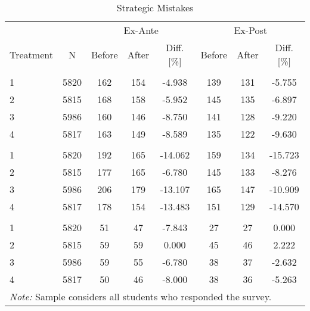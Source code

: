 \begin{table}[!htp]

\caption{Strategic Mistakes \label{tab: summary strategic mistakes}}
\centering
\begin{tabular}[t]{lccccccc}
\toprule
\multicolumn{2}{c}{ } & \multicolumn{3}{c}{Ex-Ante} & \multicolumn{3}{c}{Ex-Post} \\
\cmidrule(l{3pt}r{3pt}){3-5} \cmidrule(l{3pt}r{3pt}){6-8}
Treatment & N & Before & After & Diff. [\%] & Before & After & Diff. [\%]\\
\midrule
\addlinespace[0.3em]
\multicolumn{8}{l}{\textbf{Underconfidence}}\\
\hspace{1em}1 & 5820 & 162 & 154 & -4.938 & 139 & 131 & -5.755\\
\hspace{1em}2 & 5815 & 168 & 158 & -5.952 & 145 & 135 & -6.897\\
\hspace{1em}3 & 5986 & 160 & 146 & -8.750 & 141 & 128 & -9.220\\
\hspace{1em}4 & 5817 & 163 & 149 & -8.589 & 135 & 122 & -9.630\\
\addlinespace[0.3em]
\multicolumn{8}{l}{\textbf{Ordering}}\\
\hspace{1em}1 & 5820 & 192 & 165 & -14.062 & 159 & 134 & -15.723\\
\hspace{1em}2 & 5815 & 177 & 165 & -6.780 & 145 & 133 & -8.276\\
\hspace{1em}3 & 5986 & 206 & 179 & -13.107 & 165 & 147 & -10.909\\
\hspace{1em}4 & 5817 & 178 & 154 & -13.483 & 151 & 129 & -14.570\\
\addlinespace[0.3em]
\multicolumn{8}{l}{\textbf{Overconfidence}}\\
\hspace{1em}1 & 5820 & 51 & 47 & -7.843 & 27 & 27 & 0.000\\
\hspace{1em}2 & 5815 & 59 & 59 & 0.000 & 45 & 46 & 2.222\\
\hspace{1em}3 & 5986 & 59 & 55 & -6.780 & 38 & 37 & -2.632\\
\hspace{1em}4 & 5817 & 50 & 46 & -8.000 & 38 & 36 & -5.263\\
\bottomrule
\multicolumn{8}{l}{\rule{0pt}{1em}\textit{Note:} Sample considers all students who responded the survey.}\\
\end{tabular}
\end{table}
